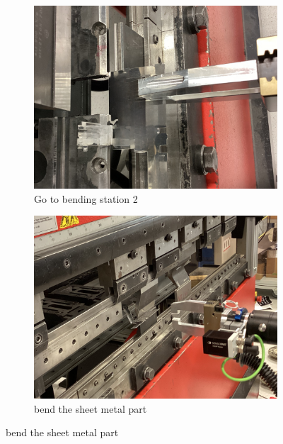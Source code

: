 \begin{figure}[h]
    \centering
    \begin{subfigure}[b]{0.32\textwidth}
        \centering
        \includegraphics[width=\textwidth]{figures/bending/bending2-003.png}
        \caption{Go to bending station 2}
        \label{subfig:bending2-before}
    \end{subfigure}\hspace{0.1cm}
    \begin{subfigure}[b]{0.32\textwidth}
        \centering
        \includegraphics[width=\textwidth]{figures/bending/bending2-001.png}
        \caption{bend the sheet metal part}
        \label{subfig:bending2}
    \end{subfigure}\hspace{0.1cm}

\end{figure}
